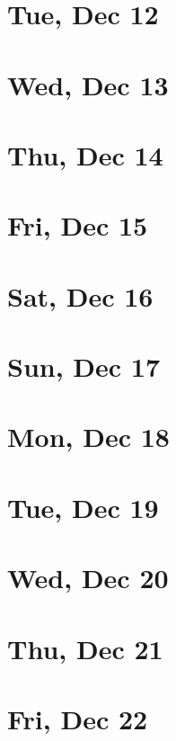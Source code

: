 	\section{Tue, Dec 12}
		
	\section{Wed, Dec 13}
		
	\section{Thu, Dec 14}
		
	\section{Fri, Dec 15}
		
	\section{Sat, Dec 16}
		
	\section{Sun, Dec 17}
		
	\section{Mon, Dec 18}
		
	\section{Tue, Dec 19}
		
	\section{Wed, Dec 20}
		
	\section{Thu, Dec 21}
		
	\section{Fri, Dec 22}
		
